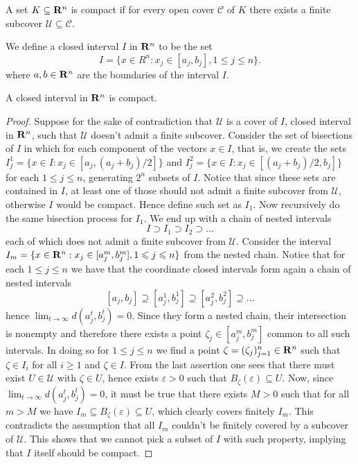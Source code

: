 \begin{definition}
A set \(K \subseteq \mathbf{R}^n\) is compact if for every open cover \(\mathcal C\)
of \(K\) there exists a finite subcover \(\mathcal U \subseteq \mathcal C\).
\end{definition}

\begin{definition}
We define a closed interval \(I\) in \(\mathbf{R}^n\) to be the set
\[
I = \{x \in R^n : x_j \in [a_j, b_j], 1 \leq j \leq n\}.
\]
where \(a, b \in \mathbf{R}^n\) are the boundaries of the interval \(I\).
\end{definition}

\begin{proposition}\label{prop: closed-interval compact}
A closed interval in \(\mathbf{R}^n\) is compact.
\end{proposition}

\begin{proof}
Suppose for the sake of contradiction that \(\mathcal U\) is a cover of \(I\),
closed interval in \(\mathbf{R}^n\), such that \(\mathcal U\) doesn't admit a finite
subcover. Consider the set of bisections of \(I\) in which for each component
of the vectors \(x \in I\), that is, we create the sets \(I_j^1 = \{x \in I:
x_j \in [a_j, (a_j + b_j)/2]\}\) and \(I_j^2 = \{x \in I: x_j \in [(a_j +
b_j)/2, b_j]\}\) for each \(1 \leq j \leq n\), generating \(2^n\) subsets of
\(I\). Notice that since these sets are contained in \(I\), at least one of
those should not admit a finite subcover from \(\mathcal U\), otherwise \(I\)
would be compact. Hence define such set as \(I_1\). Now recursively do the
same bisection process for \(I_1\). We end up with a chain of nested intervals
\[
I \supset I_1 \supset I_2 \supset \dots
\]
each of which does not admit a finite subcover from \(\mathcal U\). Consider
the interval \(I_m = \{x \in \mathbf{R}^n: x_j \in [a^m_j, b_j^m], 1 \leqslant j \leqslant n\}\)
from the nested chain. Notice that for each \(1 \leq j \leq n\) we have that
the coordinate closed intervals form again a chain of nested intervals
\[
[a_j, b_j] \supseteq [a_j^1, b_j^1] \supseteq [a_j^2, b_j^2] \supseteq \dots
\]
hence \(\lim_{t \to \infty} d(a_j^t, b_j^t) = 0\). Since they form a nested
chain, their intersection is nonempty and therefore there exists a point
\(\zeta_j \in  [a_j^m, b_j^m]\) common to all such intervals. In doing so for
\(1 \leq j \leq n\) we find a point \(\zeta = (\zeta_j)_{j=1}^n \in \mathbf{R}^n\)
such that \(\zeta \in I_i\) for all \(i \geq 1\) and \(\zeta \in I\). From the
last assertion one sees that there must exist \(U \in \mathcal U\) with
\(\zeta \in U\), hence exists \(\varepsilon > 0\) such that
\(B_\zeta(\varepsilon) \subseteq U\). Now, since \(\lim_{t \to \infty}
d(a_j^t, b_j^t) = 0\), it must be true that there exists \(M > 0\) such that
for all \(m > M\) we have \(I_m \subseteq B_\zeta(\varepsilon) \subseteq U\),
which clearly covers finitely \(I_m\). This contradicts the assumption that
all \(I_m\) couldn't be finitely covered by a subcover of \(\mathcal U\). This
shows that we cannot pick a subset of \(I\) with such property, implying that
\(I\) itself should be compact.
\end{proof}

